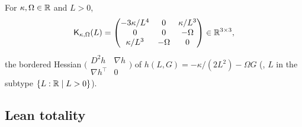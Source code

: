 \begin{definition}\label{bpI:p0:keplerborder}
For $\kappa,\Omega\in\mathbb{R}$ and $L>0$,
\[
\mathsf K_{\kappa,\Omega}(L)=\begin{pmatrix}-3\kappa/L^4&0&\kappa/L^3\\0&0&-\Omega\\ \kappa/L^3&-\Omega&0\end{pmatrix}
\in\mathbb{R}^{3\times3},
\]
the bordered Hessian $\bigl(\begin{smallmatrix}D^2h&\nabla h\\ \nabla h^\top&0\end{smallmatrix}\bigr)$ of
$h(L,G)=-\kappa/(2L^2)-\Omega G$ (, $L$ in the subtype $\{L:\mathbb{R}\mid L>0\}$).
\end{definition}

\subsection{Lean totality}

